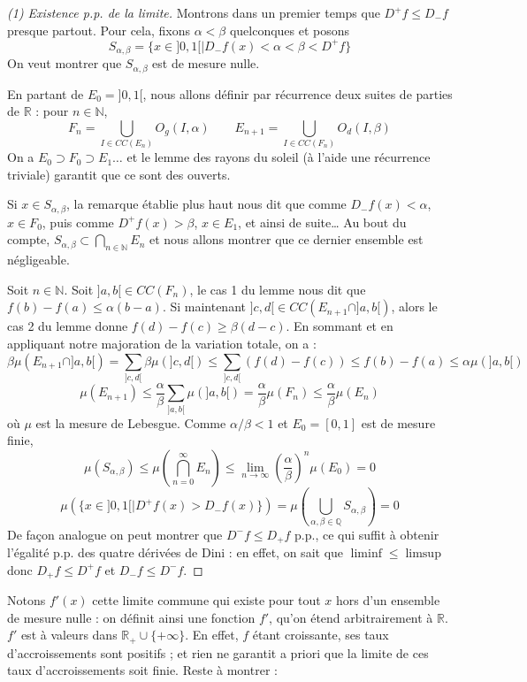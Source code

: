 \documentclass[a4paper, 11pt]{article}
\def\N{\mathbb{N}}
\def\Q{\mathbb{Q}}
\def\R{\mathbb{R}}
\begin{document}
\begin{proof}[(1) Existence p.p. de la limite]
Montrons dans un premier temps que $D^+f \leq D_-f$ presque partout. Pour cela,
fixons $\alpha < \beta$ quelconques et posons
\[ S_{\alpha,\beta} = \{ x \in ]0,1[ \mid D_-f(x) < \alpha < \beta < D^+f \} \]
On veut montrer que $S_{\alpha,\beta}$ est de mesure nulle.

En partant de $E_0 = ]0,1[$, nous allons définir par récurrence deux suites de
parties de $\R$ : pour $n \in \N$,
\[ F_n = \bigcup_{I \in CC(E_n)} O_g(I, \alpha) \qquad
   E_{n+1} = \bigcup_{I \in CC(F_n)} O_d(I, \beta) \]
On a $E_0 \supset F_0 \supset E_1 \ldots$ et le lemme des rayons du soleil (à
l'aide une récurrence triviale) garantit que ce sont des ouverts. 

Si $x \in S_{\alpha,\beta}$, la remarque établie plus haut nous dit que comme
$D_-f(x) < \alpha$, $x \in F_0$, puis comme $D^+f(x) > \beta$, $x \in E_1$, et
ainsi de suite… Au bout du compte, $S_{\alpha,\beta} \subset \bigcap_{n \in \N}
E_n$ et nous allons montrer que ce dernier ensemble est négligeable.

Soit $n \in \N$. Soit $]a,b[ \in CC(F_n)$, le cas 1 du lemme nous dit que
$f(b) - f(a) \leq \alpha(b-a)$. Si maintenant $]c,d[ \in CC(E_{n+1} \cap
]a,b[)$, alors le cas 2 du lemme donne $f(d)-f(c) \geq \beta(d-c)$. En sommant
et en appliquant notre majoration de la variation totale, on a :
\[ \beta\mu(E_{n+1} \cap ]a,b[) = \sum_{]c,d[} \beta\mu(]c,d[) \leq \sum_{]c,d[}
  (f(d) - f(c)) \leq f(b) - f(a) \leq \alpha\mu(]a,b[) \]
\[ \mu(E_{n+1}) \leq \frac{\alpha}{\beta} \sum_{]a,b[} \mu(]a,b[) =
  \frac{\alpha}{\beta} \mu(F_n) \leq \frac{\alpha}{\beta} \mu(E_n) \] où $\mu$
est la mesure de Lebesgue. Comme $\alpha/\beta < 1$ et $E_0 = [0,1]$ est de
mesure finie,
\[ \mu(S_{\alpha,\beta}) \leq \mu \left( \bigcap_{n=0}^\infty E_n \right)
  \leq \lim_{n \to \infty} \left( \frac{\alpha}{\beta} \right)^n \mu(E_0) = 0 \]
\[ \mu\left( \{x \in ]0,1[ \mid  D^+f(x) > D_-f(x) \} \right)
  = \mu\left( \bigcup_{\alpha, \beta \in \Q} S_{\alpha,\beta} \right)
  = 0 \]
De façon analogue on peut montrer que $D^-f \leq D_+f$ p.p., ce qui suffit à
obtenir l'égalité p.p. des quatre dérivées de Dini : en effet, on sait que
$\liminf \leq \limsup$ donc $D_+f \leq D^+f$ et $D_-f \leq D^-f$.
\end{proof}

Notons $f'(x)$ cette limite commune qui existe pour tout $x$ hors d'un ensemble
de mesure nulle : on définit ainsi une fonction $f'$, qu'on étend arbitrairement
à $\R$. $f'$ est à valeurs dans $\R_+ \cup \{+\infty\}$. En effet, $f$ étant
croissante, ses taux d'accroissements sont positifs ; et rien ne garantit a
priori que la limite de ces taux d'accroissements soit finie. Reste à montrer :
\end{document}
